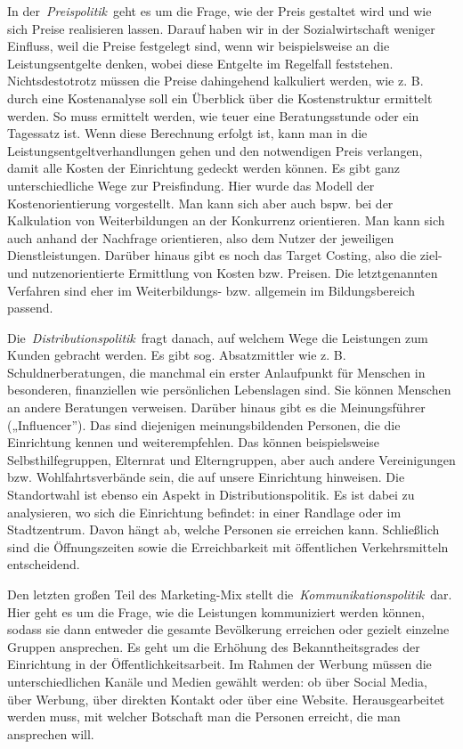 \documentclass[
  letterpaper,
]{book}
\begin{document}
In der~\emph{Preispolitik}~geht es um die Frage, wie der Preis gestaltet
wird und wie sich Preise realisieren lassen. Darauf haben wir in der
Sozialwirtschaft weniger Einfluss, weil die Preise festgelegt sind, wenn
wir beispielsweise an die Leistungsentgelte denken, wobei diese Entgelte
im Regelfall feststehen. Nichtsdestotrotz müssen die Preise dahingehend
kalkuliert werden, wie z. B. durch eine Kostenanalyse soll ein Überblick
über die Kostenstruktur ermittelt werden. So muss ermittelt werden, wie
teuer eine Beratungsstunde oder ein Tagessatz ist. Wenn diese Berechnung
erfolgt ist, kann man in die Leistungsentgeltverhandlungen gehen und den
notwendigen Preis verlangen, damit alle Kosten der Einrichtung gedeckt
werden können. Es gibt ganz unterschiedliche Wege zur Preisfindung. Hier
wurde das Modell der Kostenorientierung vorgestellt. Man kann sich aber
auch bspw. bei der Kalkulation von Weiterbildungen an der Konkurrenz
orientieren. Man kann sich auch anhand der Nachfrage orientieren, also
dem Nutzer der jeweiligen Dienstleistungen. Darüber hinaus gibt es noch
das Target Costing, also die ziel- und nutzenorientierte Ermittlung von
Kosten bzw. Preisen. Die letztgenannten Verfahren sind eher im
Weiterbildungs- bzw. allgemein im Bildungsbereich passend.

Die~\emph{Distributionspolitik}~fragt danach, auf welchem Wege die
Leistungen zum Kunden gebracht werden. Es gibt sog. Absatzmittler wie z.
B. Schuldnerberatungen, die manchmal ein erster Anlaufpunkt für Menschen
in besonderen, finanziellen wie persönlichen Lebenslagen sind. Sie
können Menschen an andere Beratungen verweisen. Darüber hinaus gibt es
die Meinungsführer („Influencer''). Das sind diejenigen
meinungsbildenden Personen, die die Einrichtung kennen und
weiterempfehlen. Das können beispielsweise Selbsthilfegruppen, Elternrat
und Elterngruppen, aber auch andere Vereinigungen bzw.
Wohlfahrtsverbände sein, die auf unsere Einrichtung hinweisen. Die
Standortwahl ist ebenso ein Aspekt in Distributionspolitik. Es ist dabei
zu analysieren, wo sich die Einrichtung befindet: in einer Randlage oder
im Stadtzentrum. Davon hängt ab, welche Personen sie erreichen kann.
Schließlich sind die Öffnungszeiten sowie die Erreichbarkeit mit
öffentlichen Verkehrsmitteln entscheidend.

Den letzten großen Teil des Marketing-Mix stellt
die~\emph{Kommunikationspolitik}~dar. Hier geht es um die Frage, wie die
Leistungen kommuniziert werden können, sodass sie dann entweder die
gesamte Bevölkerung erreichen oder gezielt einzelne Gruppen ansprechen.
Es geht um die Erhöhung des Bekanntheitsgrades der Einrichtung in der
Öffentlichkeitsarbeit. Im Rahmen der Werbung müssen die
unterschiedlichen Kanäle und Medien gewählt werden: ob über Social
Media, über Werbung, über direkten Kontakt oder über eine Website.
Herausgearbeitet werden muss, mit welcher Botschaft man die Personen
erreicht, die man ansprechen will.
\end{document}
